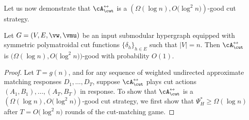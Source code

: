 \documentclass[letterpaper]{article}
\begin{document}
Let us now demonstrate that $\cA^{\leftrightarrow}_{\cut}$ is a $\left( \Omega (\log n), O \big( {\log^2 n} \big) \right)$-good cut strategy.

\begin{lemma}
\label{lem.sym-cut-strat.good}
Let $G = (V, E, \vw, \vmu)$ be an input submodular hypergraph equipped with symmetric polymatroidal cut functions $\{ \delta_h \}_{h \in E}$ such that $\lvert V \rvert = n$. Then $\cA^{\leftrightarrow}_{\cut}$ is $\Big( \Omega (\log n), O \big( \log^2 n \big) \Big)$-good with probability $O(1)$.
\end{lemma}
\begin{proof}
Let $T = g(n)$, and for any sequence of weighted undirected approximate matching responses $D_1, \ldots, D_T$, suppose $\cA^{\leftrightarrow}_{\cut}$ plays cut actions $(A_1, B_1), \ldots, (A_T, B_T)$ in response. To show that $\cA^{\leftrightarrow}_{\cut}$ is a $\left( \Omega(\log n), O\big( {\log^2 n} \big) \right)$-good cut strategy, we first show that $\Psi^*_H \geq \Omega(\log n)$ after $T = O\big( \log^2 n \big)$ rounds of the cut-matching game.


\end{proof}
\end{document}
